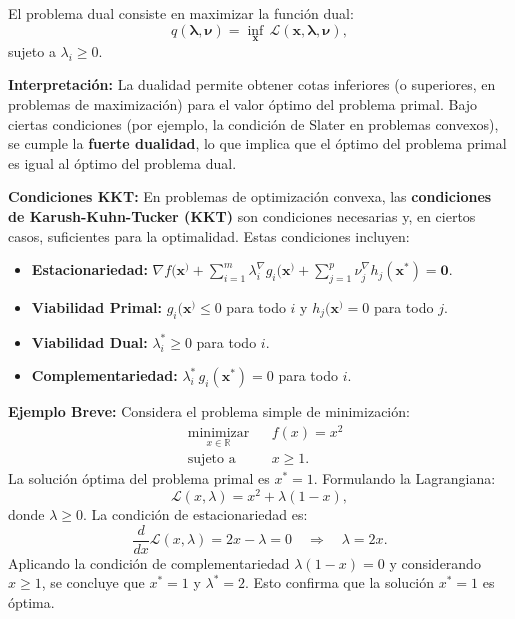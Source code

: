 \documentclass[12pt,a4,oneside]{book}
\begin{document}
	El problema dual consiste en maximizar la función dual:
	\[
	q(\boldsymbol{\lambda}, \boldsymbol{\nu}) = \inf_{\mathbf{x}} \, \mathcal{L}(\mathbf{x}, \boldsymbol{\lambda}, \boldsymbol{\nu}),
	\]
	sujeto a \(\lambda_i \geq 0\).
	
	\textbf{Interpretación:}  
	La dualidad permite obtener cotas inferiores (o superiores, en problemas de maximización) para el valor óptimo del problema primal. Bajo ciertas condiciones (por ejemplo, la condición de Slater en problemas convexos), se cumple la \textbf{fuerte dualidad}, lo que implica que el óptimo del problema primal es igual al óptimo del problema dual.
	
	\textbf{Condiciones KKT:}  
	En problemas de optimización convexa, las \textbf{condiciones de Karush-Kuhn-Tucker (KKT)} son condiciones necesarias y, en ciertos casos, suficientes para la optimalidad. Estas condiciones incluyen:
	\begin{itemize}
		\item \textbf{Estacionariedad:} \(\nabla f(\mathbf{x}^) + \sum_{i=1}^{m} \lambda_i^ \nabla g_i(\mathbf{x}^) + \sum_{j=1}^{p} \nu_j^ \nabla h_j(\mathbf{x}^*) = \mathbf{0}\).
		\item \textbf{Viabilidad Primal:} \(g_i(\mathbf{x}^) \leq 0\) para todo \(i\) y \(h_j(\mathbf{x}^) = 0\) para todo \(j\).
		\item \textbf{Viabilidad Dual:} \(\lambda_i^* \geq 0\) para todo \(i\).
		\item \textbf{Complementariedad:} \(\lambda_i^* \, g_i(\mathbf{x}^*) = 0\) para todo \(i\).
	\end{itemize}
	
	\textbf{Ejemplo Breve:}  
	Considera el problema simple de minimización:
	\[
	\begin{aligned}
		& \underset{x \in \mathbb{R}}{\text{minimizar}}
		& & f(x) = x^2 \\
		& \text{sujeto a}
		& & x \geq 1.
	\end{aligned}
	\]
	La solución óptima del problema primal es \(x^* = 1\). Formulando la Lagrangiana:
	\[
	\mathcal{L}(x, \lambda) = x^2 + \lambda (1 - x),
	\]
	donde \(\lambda \geq 0\). La condición de estacionariedad es:
	\[
	\frac{d}{dx}\mathcal{L}(x, \lambda) = 2x - \lambda = 0 \quad \Rightarrow \quad \lambda = 2x.
	\]
	Aplicando la condición de complementariedad \(\lambda (1 - x) = 0\) y considerando \(x \geq 1\), se concluye que \(x^* = 1\) y \(\lambda^* = 2\). Esto confirma que la solución \(x^* = 1\) es óptima.
	
\end{document}
